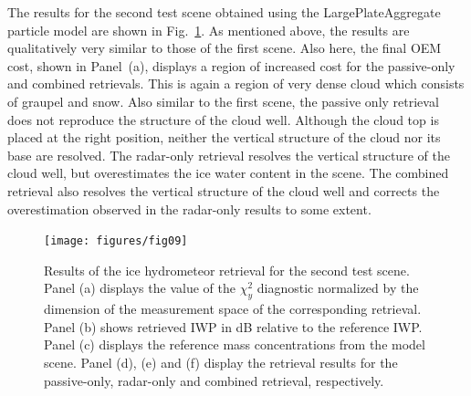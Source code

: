 \documentclass[journal abbreviation, manuscript]{copernicus}
\begin{document}





\appendix

The results for the second test scene obtained using the LargePlateAggregate
particle model are shown in Fig.~\ref{fig:results_b}. As mentioned above, the
results are qualitatively very similar to those of the first scene. Also here,
the final OEM cost, shown in Panel~(a), displays a region of increased cost for
the passive-only and combined retrievals. This is again a region of very dense
cloud which consists of graupel and snow. Also similar to the first scene, the
passive only retrieval does not reproduce the structure of the cloud well.
Although the cloud top is placed at the right position, neither the vertical
structure of the cloud nor its base are resolved. The radar-only retrieval
resolves the vertical structure of the cloud well, but overestimates the ice
water content in the scene. The combined retrieval also resolves the vertical
structure of the cloud well and corrects the overestimation observed in the
radar-only results to some extent.

\begin{figure}
\centering
\texttt{[image: figures/fig09]}
\caption{Results of the ice hydrometeor retrieval for the second test scene.
  Panel (a) displays the value of the $\chi^2_y$ diagnostic normalized by the
  dimension of the measurement space of the corresponding retrieval. Panel (b)
  shows retrieved IWP in dB relative to the reference IWP. Panel (c) displays
  the reference mass concentrations from the model scene. Panel (d), (e) and (f)
  display the retrieval results for the passive-only, radar-only and combined
  retrieval, respectively.}
\label{fig:results_b}
\end{figure}
\end{document}
